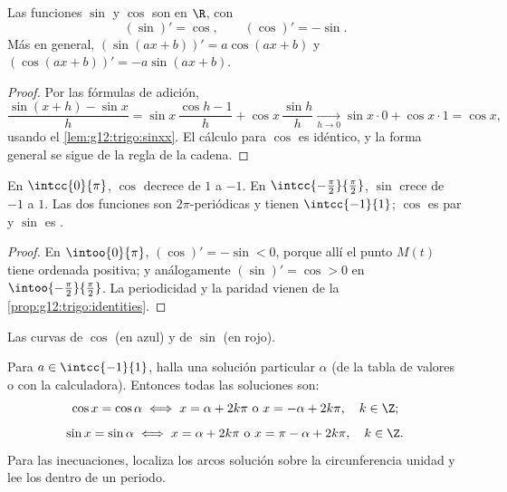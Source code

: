 \begin{theorem}\label{thm:g12:trigo:derivatives}
Las funciones $\sin$ y $\cos$ son  en $\R$, con
\[
(\sin)' = \cos, \qquad (\cos)' = -\sin .
\]
Más en general, $(\sin(ax+b))' = a\cos(ax+b)$ y
$(\cos(ax+b))' = -a\sin(ax+b)$.
\end{theorem}

\begin{proof}
Por las fórmulas de adición,
\[
\frac{\sin(x+h) - \sin x}{h}
= \sin x\,\frac{\cos h - 1}{h} + \cos x\,\frac{\sin h}{h}
\xrightarrow[h\to0]{} \sin x \cdot 0 + \cos x \cdot 1 = \cos x,
\]
usando el \cref{lem:g12:trigo:sinxx}. El cálculo para $\cos$ es idéntico, y
la forma general se sigue de la regla de la cadena.
\end{proof}

\begin{proposition}[Variación]\label{prop:g12:trigo:variations}
En $\intcc{0}{\pi}$, $\cos$ decrece de $1$ a $-1$. En
$\intcc{-\frac\pi2}{\frac\pi2}$, $\sin$ crece de $-1$ a $1$. Las dos
funciones son $2\pi$-periódicas y tienen  $\intcc{-1}{1}$; $\cos$
es par y $\sin$ es .
\end{proposition}

\begin{proof}
En $\intoo{0}{\pi}$, $(\cos)' = -\sin < 0$, porque allí el punto $M(t)$
tiene ordenada positiva; y análogamente $(\sin)' = \cos > 0$ en
$\intoo{-\frac\pi2}{\frac\pi2}$. La periodicidad y la paridad vienen de la
\cref{prop:g12:trigo:identities}.
\end{proof}

\begin{omfigure}

{\small Las curvas de $\cos$ (en azul) y de $\sin$ (en rojo).}
\end{omfigure}

\begin{method}[Resolver $\cos x = a$ y $\sin x = a$]\label{met:g12:trigo:equations}
Para $a \in \intcc{-1}{1}$, halla una solución particular $\alpha$ (de la
tabla de valores o con la calculadora). Entonces todas las soluciones son:
\[
\cos x = \cos\alpha \iff x = \alpha + 2k\pi \text{ o } x = -\alpha + 2k\pi,
\quad k \in \Z;
\]
\[
\sin x = \sin\alpha \iff x = \alpha + 2k\pi \text{ o } x = \pi - \alpha + 2k\pi,
\quad k \in \Z.
\]
Para las inecuaciones, localiza los arcos solución sobre la circunferencia
unidad y lee los  dentro de un periodo.
\end{method}

